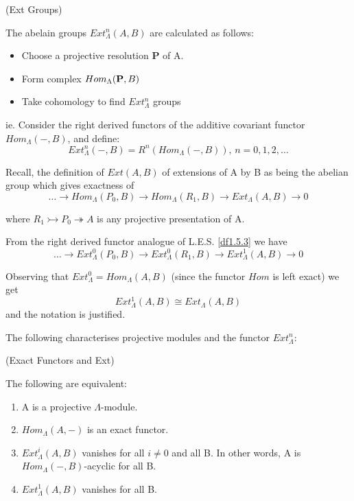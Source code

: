 \begin{definition}(Ext Groups\label{df1.6.1})

The abelain groups $Ext_\Lambda^n(A,B)$ are calculated as follows:
\begin{itemize}
    \item Choose a projective resolution \textbf P of A.
    \item Form complex $Hom_\Lambda (\textbf P, B)$
    \item Take cohomology to find $Ext^n_\Lambda$ groups
\end{itemize}

\end{definition}

ie. Consider the right derived functors of the additive covariant
functor $Hom_\Lambda(-,B)$, and define:
$$Ext^n_\Lambda (-,B) = R^n(Hom_\Lambda (-,B)),\, n=0,1,2,\dots$$

Recall, the definition of $Ext(A,B)$ of extensions of A by B as
being the abelian group which gives exactness of 
$$\dots \rightarrow Hom_\Lambda(P_0,B)\rightarrow
Hom_\Lambda(R_1,B)\rightarrow Ext_\Lambda(A,B)\rightarrow 0$$

where $R_1\rightarrowtail P_0\twoheadrightarrow A$ is any
projective presentation of A.

From the right derived functor analogue of L.E.S. \ref{df1.5.3} we
have
$$\dots \rightarrow Ext^0_\Lambda(P_0,B)\rightarrow
Ext^0_\Lambda(R_1,B)\rightarrow Ext^1_\Lambda(A,B)\rightarrow 0$$

Observing that $Ext^0_\Lambda = Hom_\Lambda (A,B)$ (since the
functor $Hom$ is left exact) we get
$$Ext^1_\Lambda (A,B) \cong Ext_\Lambda (A,B)$$ and the notation
is justified.

The following characterises projective modules and the functor
$Ext^n_\Lambda$:

\begin{proposition}(Exact Functors and Ext\label{1.6.2})

The following are equivalent:
\begin{enumerate}
    \item A is a projective $\Lambda$-module.
    \item $Hom_\Lambda (A,-)$ is an exact functor.
    \item $Ext^i_\Lambda (A,B)$ vanishes for all $i\neq 0$ and all
    B. In other words, A is \\ $Hom_\Lambda (-,B)$-acyclic for all
    B.
    \item $Ext_\Lambda^1 (A,B)$ vanishes for all B.
\end{enumerate}
\end{proposition}

